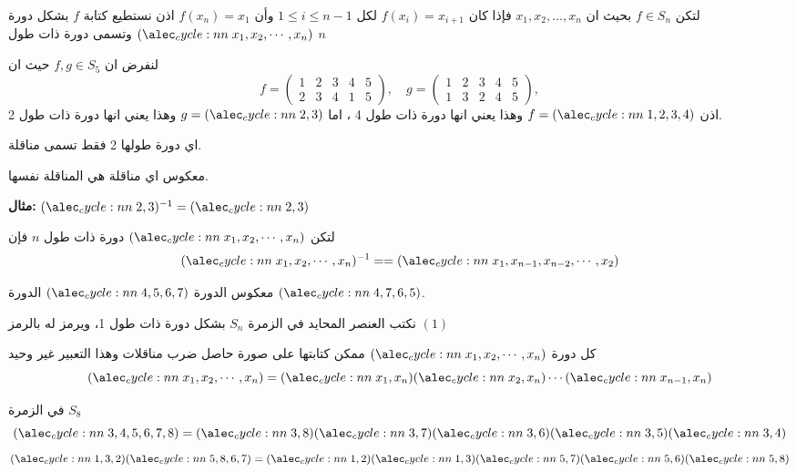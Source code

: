 \begin{definition}
	لتكن $f\in S_n$ بحيث ان $x_1, x_2, \dots, x_n$ فإذا كان $f(x_i) = x_{i+1}$ لكل $1\leq i\leq n-1$ وأن $f(x_n)=x_1$ اذن نستطيع كتابة $f$ بشكل دورة $\cycle{x_1, x_2, \cdots, x_n}$ وتسمى دورة ذات طول  $n$ 
\end{definition}

\begin{example}
	لنفرض ان $f, g\in S_5$ حيث ان
	\[
	f = \begin{pmatrix}
		1&2&3&4&5\\
		2&3&4&1&5
	\end{pmatrix}, \quad
		g = \begin{pmatrix}
		1&2&3&4&5\\
		1&3&2&4&5
	\end{pmatrix}, 
	\]
	اذن $f=\cycle{1,2,3,4}$ وهذا يعني انها دورة ذات طول 4 ، اما $g=\cycle{2,3}$ وهذا يعني انها دورة ذات طول 2.
\end{example}

\begin{definition}
	اي دورة طولها 2 فقط تسمى مناقلة.
\end{definition}

\begin{lemma}
معكوس اي مناقلة هي المناقلة نفسها.
\end{lemma}
\noindent
\textbf{مثال: }$\cycle{2,3}^{-1} = \cycle{2,3}$

\begin{lemma}
	لتكن $\cycle{x_1, x_2, \cdots, x_n}$ دورة ذات طول $n$ فإن
	\[
	\cycle{x_1, x_2, \cdots, x_n}^{-1} = = \cycle{x_1, x_{n-1}, x_{n-2}, \cdots, x_2}
	\]
\end{lemma}

\begin{example}
	معكوس الدورة $\cycle{4,5,6,7}$ الدورة $\cycle{4, 7,6,5}$.
\end{example}

\begin{note}
	نكتب العنصر المحايد في الزمرة $S_n$ بشكل دورة ذات طول 1، ويرمز له  بالرمز $(1)$
\end{note}

\begin{theorem}
	كل دورة $\cycle{x_1, x_2, \cdots, x_n}$ ممكن كتابتها على صورة حاصل ضرب مناقلات وهذا التعبير غير وحيد
	\[
	\cycle{x_1, x_2, \cdots, x_n} = \cycle{x_1, x_n}\cycle{x_2, x_n}\cdots\cycle{x_{n-1}, x_n}
	\]
\end{theorem}
\begin{example}
	في الزمرة $S_8$ 
	\[
	\cycle{3,4,5,6,7,8} = \cycle{3, 8} \cycle{3, 7} \cycle{3, 6} \cycle{3, 5} \cycle{3, 4}
	\]
	\[
	\cycle{1,3,2}\cycle{5,8,6,7} =  \cycle{1,2 } \cycle{1,3} \cycle{5,7 }  \cycle{5,6 }\cycle{5,8}
	\]
\end{example}

